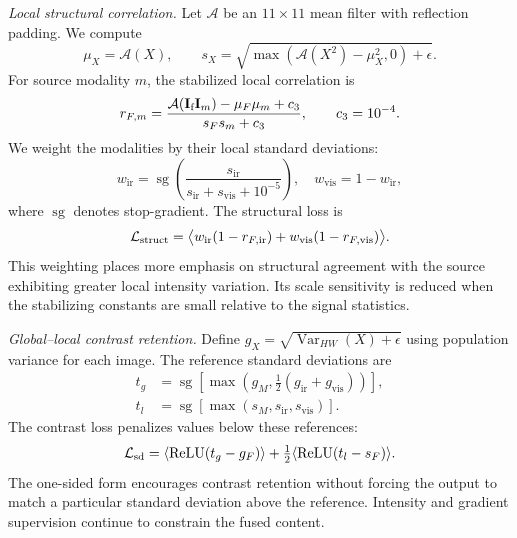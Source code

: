 \textit{Local structural correlation.}
Let $\mathcal A$ be an $11\times11$ mean filter with reflection padding. We compute
\begin{equation}
 \mu_X=\mathcal A(X),\qquad
 s_X=\sqrt{\max(\mathcal A(X^2)-\mu_X^2,0)+\epsilon}.
\end{equation}
For source modality $m$, the stabilized local correlation is
\begin{equation}
 r_{F,m}=\frac{\mathcal A(\mathbf{I}_{\text{f}}\mathbf I_m)-\mu_F\mu_m+c_3}
 {s_Fs_m+c_3},\qquad c_3=10^{-4}.
\end{equation}
We weight the modalities by their local standard deviations:
\begin{equation}
 w_{\mathrm{ir}}=\operatorname{sg}\!\left(
 \frac{s_{\mathrm{ir}}}{s_{\mathrm{ir}}+s_{\mathrm{vis}}+10^{-5}}\right),
 \quad w_{\mathrm{vis}}=1-w_{\mathrm{ir}},
\end{equation}
where $\operatorname{sg}$ denotes stop-gradient. The structural loss is
\begin{equation}
 \mathcal{L}_{\text{struct}}=\big\langle w_{\mathrm{ir}}(1-r_{F,\mathrm{ir}})
              +w_{\mathrm{vis}}(1-r_{F,\mathrm{vis}})\big\rangle.
\end{equation}
This weighting places more emphasis on structural agreement with the source exhibiting greater local intensity variation. Its scale sensitivity is reduced when the stabilizing constants are small relative to the signal statistics.

\textit{Global--local contrast retention.}
Define $g_X=\sqrt{\operatorname{Var}_{HW}(X)+\epsilon}$ using population variance for each image. The reference standard deviations are
\begin{equation}
\begin{aligned}
 t_g&=\operatorname{sg}\!\left[\max\left(g_M,
                 \tfrac12(g_{\mathrm{ir}}+g_{\mathrm{vis}})\right)\right],\\
 t_l&=\operatorname{sg}[\max(s_M,s_{\mathrm{ir}},s_{\mathrm{vis}})].
\end{aligned}
\end{equation}
The contrast loss penalizes values below these references:
\begin{equation}
 \mathcal{L}_{\text{sd}}=\langle\operatorname{ReLU}(t_g-g_F)\rangle
      +\tfrac12\langle\operatorname{ReLU}(t_l-s_F)\rangle.
\end{equation}
The one-sided form encourages contrast retention without forcing the output to match a particular standard deviation above the reference. Intensity and gradient supervision continue to constrain the fused content.


